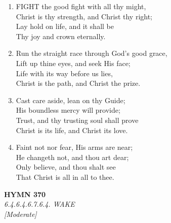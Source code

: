 \documentclass[11pt,a4paper]{article}
\begin{document}
\begin{enumerate}
    \item FIGHT the good fight with all thy might, \\
        Christ is thy strength, and Christ thy right; \\
        Lay hold on life, and it shall be \\
        Thy joy and crown eternally.

    \item Run the straight race through God's good grace, \\
        Lift up thine eyes, and seek His face; \\
        Life with its way before us lies, \\
        Christ is the path, and Christ the prize.

    \item Cast care aside, lean on thy Guide; \\
        His boundless mercy will provide; \\
        Trust, and thy trusting soul shall prove \\
        Christ is its life, and Christ its love.

    \item Faint not nor fear, His arms are near; \\
        He changeth not, and thou art dear; \\
        Only believe, and thou shalt see \\
        That Christ is all in all to thee.

\end{enumerate}

\newpage
\begin{center}
    {\Large \textbf{HYMN 370}}
    \\
    \textit{6.4.6.4.6.7.6.4. WAKE}
    \\
    \textit{\small [Moderate]}
\end{center}
\vspace{1em}
\end{document}

